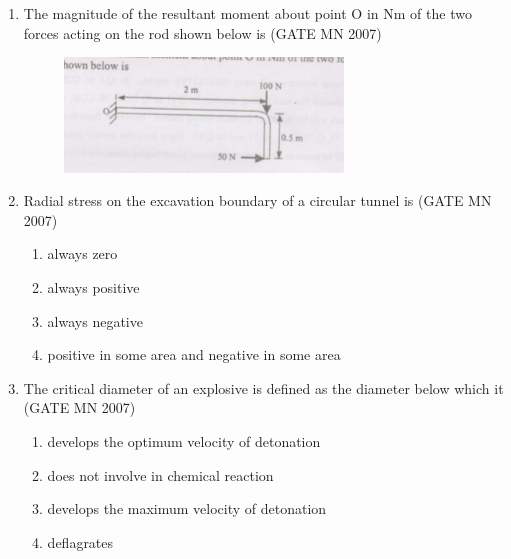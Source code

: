 \documentclass[journal]{IEEEtran}
\begin{document}
\begin{enumerate}
    \item The magnitude of the resultant moment about point O in Nm of the two forces acting on the rod shown below is
	    \hfill (GATE MN 2007)
    \begin{figure}[H]
    \centering
        \includegraphics[width=0.7\textwidth]{Screenshot_2025_0812_111906.png}
	    \caption*{}
    \label{fig:Q4}
    \end{figure}
    \begin{enumerate}
	\begin{multicols}{4}	    
        \item 25 
        \item 125 
        \item 175 
        \item 225 
	\end{multicols}	
    \end{enumerate}


    \item Radial stress on the excavation boundary of a circular tunnel is
	    \hfill (GATE MN 2007)
    \begin{enumerate}
		    
        \item always zero
        \item always positive
        \item always negative
        \item positive in some area and negative in some area
		
    \end{enumerate}


    \item The critical diameter of an explosive is defined as the diameter below which it
	    \hfill (GATE MN 2007)
    \begin{enumerate}
        \item develops the optimum velocity of detonation
        \item does not involve in chemical reaction
        \item develops the maximum velocity of detonation
        \item deflagrates
		

\end{enumerate}
\end{enumerate}
\end{document}

